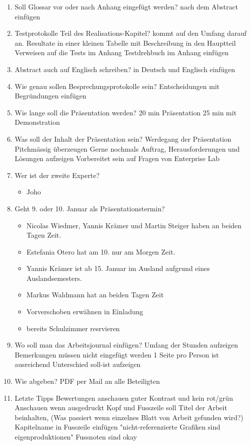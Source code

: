 \documentclass[a4paper, table]{article}
\begin{document}
\begin{enumerate}
    \item Soll Glossar vor oder nach Anhang eingefügt werden?
        nach dem Abstract einfügen
    \item Testprotokolle Teil des Realisations-Kapitel?
        kommt auf den Umfang darauf an.
        Resultate in einer kleinen Tabelle mit Beschreibung in den Hauptteil
        Verweisen auf die Tests im Anhang
        Testdrehbuch im Anhang einfügen
    \item Abstract auch auf Englisch schreiben?
        in Deutsch und Englisch einfügen
    \item Wie genau sollen Besprechungsprotokolle sein?
        Entscheidungen mit Begründungen einfügen
    \item Wie lange soll die Präsentation werden?
        20 min Präsentation
        25 min mit Demonstration
    \item Was soll der Inhalt der Präsentation sein?
        Werdegang der Präsentation
        Pitchmässig überzeugen
        Gerne nochmals Auftrag, Herausforderungen und Lösungen aufzeigen
        Vorbereitet sein auf Fragen von Enterprise Lab

    \item Wer ist der zweite Experte?
        \begin{itemize}
            \item Joho
        \end{itemize}
    \item Geht 9. oder 10. Januar als Präsentationstermin?
        \begin{itemize}
            \item Nicolas Wiedmer, Yannis Krämer und Martin Steiger haben an beiden Tagen Zeit.
            \item Estefania Otero hat am 10. nur am Morgen Zeit.
            \item Yannis Krämer ist ab 15. Januar im Ausland aufgrund eines Auslandsemesters.
            \item Markus Waldmann hat an beiden Tagen Zeit 
            \item Vorverschoben erwähnen in Einladung
            \item bereits Schulzimmer resrvieren
        \end{itemize}
    \item Wo soll man das Arbeitsjournal einfügen?
        Umfang der Stunden aufzeigen
        Bemerkungen müssen nicht eingefügt werden
        1 Seite pro Person ist ausreichend
        Unterschied soll-ist aufzeigen
    \item Wie abgeben?
        PDF per Mail an alle Beteiligten
    \item Letzte Tipps
        Bewertungen anschauen
        guter Kontrast  und kein rot/grün
        Anschauen wenn ausgedruckt
        Kopf und Fusszeile soll Titel der Arbeit beinhalten,
        (Was passiert wenn einzelnes Blatt von Arbeit gefunden wird?)
        Kapitelname in Fusszeile einfügen
        "nicht-referenzierte Grafiken sind eigenproduktionen"
        Fussnoten sind okay
\end{enumerate}
\end{document}
